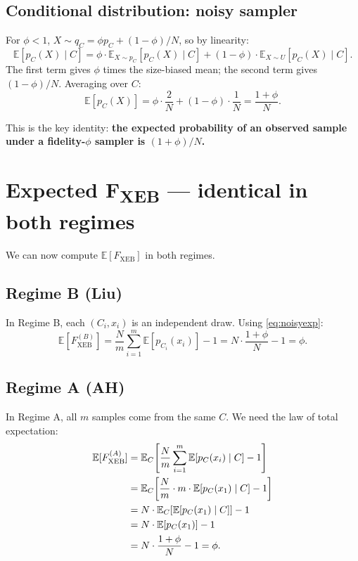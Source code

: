 \documentclass[11pt]{article}
\theoremstyle{definition}
\theoremstyle{remark}
\newcommand{\E}{\mathbb{E}}
\begin{document}
\subsection{Conditional distribution: noisy sampler}

For $\phi < 1$, $X \sim q_C = \phi p_C + (1-\phi)/N$, so by linearity:
\begin{equation}
  \E[p_C(X) \mid C] = \phi \cdot \E_{X \sim p_C}[p_C(X) \mid C] + (1-\phi)
    \cdot \E_{X \sim U}[p_C(X) \mid C].
  \label{eq:noisycond}
\end{equation}
The first term gives $\phi$ times the size-biased mean; the second term
gives $(1-\phi)/N$. Averaging over $C$:
\begin{equation}
  \E[p_C(X)] = \phi \cdot \frac{2}{N} + (1-\phi) \cdot \frac{1}{N}
   = \frac{1 + \phi}{N}.
  \label{eq:noisyexp}
\end{equation}

This is the key identity: \textbf{the expected probability of an observed
sample under a fidelity-$\phi$ sampler is $(1+\phi)/N$.}

\section{Expected F\textsubscript{XEB} --- identical in both regimes}
\label{sec:exp}

We can now compute $\E[F_{\mathrm{XEB}}]$ in both regimes.

\subsection{Regime B (Liu)}

In Regime B, each $(C_i, x_i)$ is an independent draw. Using
\eqref{eq:noisyexp}:
\begin{equation}
  \E[F_{\mathrm{XEB}}^{(B)}]
   = \frac{N}{m} \sum_{i=1}^m \E[p_{C_i}(x_i)] - 1
   = N \cdot \frac{1+\phi}{N} - 1
   = \phi.
   \label{eq:expB}
\end{equation}

\subsection{Regime A (AH)}

In Regime A, all $m$ samples come from the same $C$. We need the law of
total expectation:
\begin{align}
  \E[F_{\mathrm{XEB}}^{(A)}]
   &= \E_C\!\left[ \frac{N}{m} \sum_{i=1}^m \E[p_C(x_i) \mid C] - 1
   \right] \notag \\
   &= \E_C\!\left[ \frac{N}{m} \cdot m \cdot \E[p_C(x_1) \mid C] -1 \right]
   \notag \\
   &= N \cdot \E_C\!\left[ \E[p_C(x_1) \mid C] \right] - 1 \notag \\
   &= N \cdot \E[p_C(x_1)] - 1 \notag \\
   &= N \cdot \frac{1+\phi}{N} - 1 = \phi.
   \label{eq:expA}
\end{align}
\end{document}
